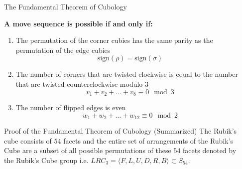 \documentclass[final]{beamer}
\newlength{\sepwidth}
\newlength{\colwidth}
\newcommand{\separatorcolumn}{\begin{column}{\sepwidth}\end{column}}
\begin{document}
\begin{frame}[t]
\begin{columns}[t]
\separatorcolumn

\begin{column}{\colwidth}

  \begin{alertblock}{The Fundamental Theorem of Cubology}

    \textbf{A move sequence is possible if and only if:}

    \begin{enumerate}
      \item The permutation of the corner cubies has the same parity as the permutation of the edge cubies
      $$\text{sign}(\rho) = \text{sign}(\sigma)$$
      \item The number of corners that are twisted clockwise is equal to the number that are twisted counterclockwise modulo $3$
      $$v_{1} + v_{2} +\dots +v_{8} \equiv 0 \mod 3$$
      \item The number of flipped edges is even
      $$w_{1} + w_{2} +\dots +w_{12} \equiv 0 \mod 2$$
    \end{enumerate}


  \end{alertblock}

  \begin{block}{Proof of the Fundamental Theorem of Cubology (Summarized)}
    The Rubik's cube consists of $54$ facets and the entire set of arrangements of the Rubik's Cube are a subset of all possible permutations of these $54$ facets
    denoted by the Rubik's Cube group i.e. $LRC_{3} = \langle F,L,U,D,R,B\rangle \subset S_{54}$.

    \begin{figure}
      \centering
      \begin{multicols}{2}


\end{multicols}
\end{figure}
\end{block}
\end{column}
\end{columns}
\end{frame}
\end{document}
